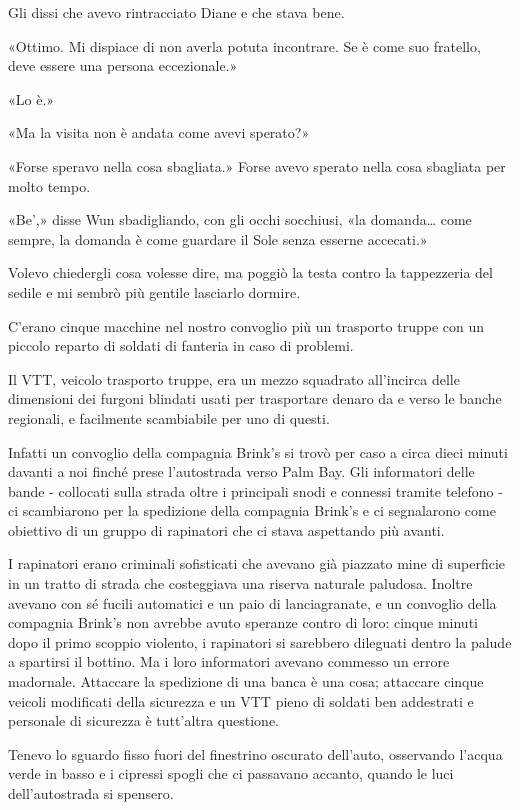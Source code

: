 Gli dissi che avevo rintracciato Diane e che stava bene.

«Ottimo. Mi dispiace di non averla potuta incontrare. Se è come suo
fratello, deve essere una persona eccezionale.»

«Lo è.»

«Ma la visita non è andata come avevi sperato?»

«Forse speravo nella cosa sbagliata.» Forse avevo sperato nella cosa
sbagliata per molto tempo.

«Be',» disse Wun sbadigliando, con gli occhi socchiusi, «la
domanda\ldots{} come sempre, la domanda è come guardare il Sole senza
esserne accecati.»

Volevo chiedergli cosa volesse dire, ma poggiò la testa contro la
tappezzeria del sedile e mi sembrò più gentile lasciarlo dormire.

\separatorefiori

C'erano cinque macchine nel nostro convoglio più un trasporto truppe con
un piccolo reparto di soldati di fanteria in caso di problemi.

Il VTT, veicolo trasporto truppe, era un mezzo squadrato all'incirca
delle dimensioni dei furgoni blindati usati per trasportare denaro da e
verso le banche regionali, e facilmente scambiabile per uno di questi.

Infatti un convoglio della compagnia Brink's si trovò per caso a circa
dieci minuti davanti a noi finché prese l'autostrada verso Palm Bay. Gli
informatori delle bande - collocati sulla strada oltre i principali
snodi e connessi tramite telefono - ci scambiarono per la spedizione
della compagnia Brink's e ci segnalarono come obiettivo di un gruppo di
rapinatori che ci stava aspettando più avanti.

I rapinatori erano criminali sofisticati che avevano già piazzato mine
di superficie in un tratto di strada che costeggiava una riserva
naturale paludosa. Inoltre avevano con sé fucili automatici e un paio di
lanciagranate, e un convoglio della compagnia Brink's non avrebbe avuto
speranze contro di loro: cinque minuti dopo il primo scoppio violento, i
rapinatori si sarebbero dileguati dentro la palude a spartirsi il
bottino. Ma i loro informatori avevano commesso un errore madornale.
Attaccare la spedizione di una banca è una cosa; attaccare cinque
veicoli modificati della sicurezza e un VTT pieno di soldati ben
addestrati e personale di sicurezza è tutt'altra questione.

Tenevo lo sguardo fisso fuori del finestrino oscurato dell'auto,
osservando l'acqua verde in basso e i cipressi spogli che ci passavano
accanto, quando le luci dell'autostrada si spensero.

